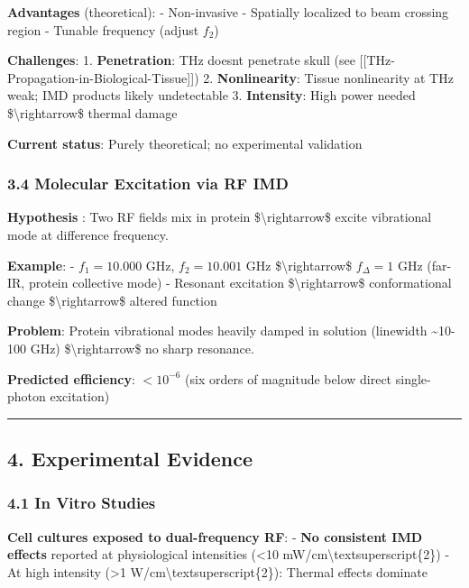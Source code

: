 \textbf{Advantages} (theoretical): - Non-invasive - Spatially localized
to beam crossing region - Tunable frequency (adjust \(f_2\))

\textbf{Challenges}: 1. \textbf{Penetration}: THz
doesn\textquotesingle t penetrate skull (see
{[}{[}THz-Propagation-in-Biological-Tissue{]}{]}) 2.
\textbf{Nonlinearity}: Tissue nonlinearity at THz weak; IMD products
likely undetectable 3. \textbf{Intensity}: High power needed
\$\textbackslash rightarrow\$ thermal damage

\textbf{Current status}: Purely theoretical; no experimental validation

\subsubsection{3.4 Molecular Excitation via RF
IMD}\label{molecular-excitation-via-rf-imd}

\textbf{Hypothesis} : Two RF fields mix in protein
\$\textbackslash rightarrow\$ excite vibrational mode at difference
frequency.

\textbf{Example}: - \(f_1 = 10.000\) GHz, \(f_2 = 10.001\) GHz
\$\textbackslash rightarrow\$ \(f_{\Delta} = 1\) GHz (far-IR, protein
collective mode) - Resonant excitation \$\textbackslash rightarrow\$
conformational change \$\textbackslash rightarrow\$ altered function

\textbf{Problem}: Protein vibrational modes heavily damped in solution
(linewidth \textasciitilde10-100 GHz) \$\textbackslash rightarrow\$ no
sharp resonance.

\textbf{Predicted efficiency}: \(<10^{-6}\) (six orders of magnitude
below direct single-photon excitation)

\begin{center}\rule{0.5\linewidth}{0.5pt}\end{center}

\subsection{4. Experimental Evidence}\label{experimental-evidence}

\subsubsection{4.1 In Vitro Studies}\label{in-vitro-studies}

\textbf{Cell cultures exposed to dual-frequency RF}: - \textbf{No
consistent IMD effects} reported at physiological intensities
(\textless10 mW/cm\textbackslash textsuperscript\{2\}) - At high
intensity (\textgreater1 W/cm\textbackslash textsuperscript\{2\}):
Thermal effects dominate

